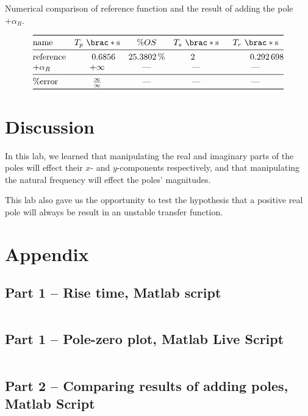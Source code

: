 \documentclass[12pt]{article}
\DeclarePairedDelimiter\brac[]%
\begin{document}
\begin{table}[]
    \centering
    \caption{Numerical comparison of reference function and the result of adding the pole $+\alpha_R$.}
    \[
        \begin{array}{@{}>$l<$SSSS@{}}
        \toprule
            name &
            T_p\ \brac*{\si\second}
                & \%OS
                & T_s\ \brac*{\si\second}
                & T_r\ \brac*{\si\second}
        \\*
        \midrule
            reference &
            0.6856 & \SI{25.3802}\percent & 2 & 0.292698
        \\*
            $+\alpha_R$ &
            \text{$+\infty$} & \text{---} & \text{---} & \text{---}
        \\*
        \midrule
            \%error &
            \frac\infty\infty
                & \text{---}
                & \text{---}
                & \text{---}
        \\*
        \bottomrule
        \end{array}
    \]
    \label{tab:positive real poles}
\end{table}

\section{Discussion}

In this lab, we learned that manipulating the real and imaginary parts of the poles will effect their $x$- and $y$-components respectively, and that manipulating the natural frequency will effect the poles' magnitudes.

This lab also gave us the opportunity to test the hypothesis that a positive real pole will always be result in an unstable transfer function.

\newpage
\printbibliography

\newpage
\appendix
\section{Appendix}

\subsection{Part 1 -- Rise time, Matlab script}\label{sap:solving for .9cf and .1cf}
\inputminted{matlab}{src/part01a_rise_time.m}

\subsection{Part 1 -- Pole-zero plot, Matlab Live Script}\label{sap:pzplot}
\inputminted{matlab}{src/part01a_pzplot_mlx.m}

\subsection{Part 2 -- Comparing results of adding poles, Matlab Script}\label{sap:adding poles}
\inputminted{matlab}{src/part02_adding_poles.m}
\end{document}
